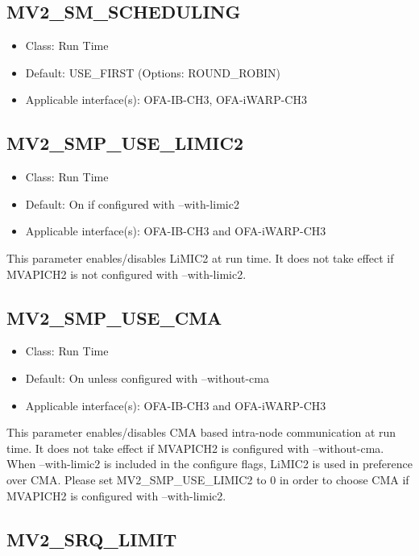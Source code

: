 \subsection{MV2\_SM\_SCHEDULING}
\label{def:mv2-sm-scheduling}
\begin{itemize}
    \item Class: Run Time
    \item Default: USE\_FIRST (Options: ROUND\_ROBIN)
    \item Applicable interface(s): OFA-IB-CH3, OFA-iWARP-CH3
\end{itemize}

\subsection{MV2\_SMP\_USE\_LIMIC2}
\label{def:mv2-smp-limic2}
\begin{itemize}
    \item Class: Run Time
    \item Default: On if configured with --with-limic2
    \item Applicable interface(s): OFA-IB-CH3 and OFA-iWARP-CH3
\end{itemize}

This parameter enables/disables LiMIC2 at run time. It does
not take effect if MVAPICH2 is not configured with --with-limic2.

\subsection{MV2\_SMP\_USE\_CMA}
\label{def:mv2-smp-cma}
\begin{itemize}
    \item Class: Run Time
    \item Default: On unless configured with --without-cma
    \item Applicable interface(s): OFA-IB-CH3 and OFA-iWARP-CH3
\end{itemize}

This parameter enables/disables CMA based intra-node communication at run time. 
It does not take effect if MVAPICH2 is configured with --without-cma.
When --with-limic2 is included in the configure flags, LiMIC2 is used in
preference over CMA. Please set MV2\_SMP\_USE\_LIMIC2 to 0 in order to choose
CMA if MVAPICH2 is configured with --with-limic2.

\subsection{MV2\_SRQ\_LIMIT}
\label{def:viadev-srq-limit}

